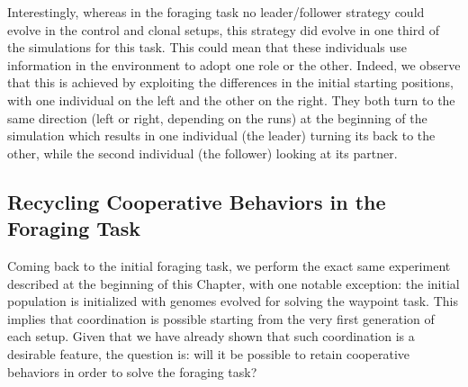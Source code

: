     Interestingly, whereas in the foraging task no leader/follower strategy could evolve in the control and clonal setups, this strategy did evolve in one third of the simulations for this task. This could mean that these individuals use information in the environment to adopt one role or the other. Indeed, we observe that this is achieved by exploiting the differences in the initial starting positions, with one individual on the left and the other on the right. They both turn to the same direction (left or right, depending on the runs) at the beginning of the simulation which results in one individual (the leader) turning its back to the other, while the second individual (the follower) looking at its partner. 


  \subsection{Recycling Cooperative Behaviors in the Foraging Task}

    Coming back to the initial foraging task, we perform the exact same experiment described at the beginning of this Chapter, with one notable exception: the initial population is initialized with genomes evolved for solving the waypoint task. This implies that coordination is possible starting from the very first generation of each setup. Given that we have already shown that such coordination is a desirable feature, the question is: will it be possible to retain cooperative behaviors in order to solve the foraging task?

    \begin{table}[h]
      \caption{\textbf{Evolution of a cooperative strategy.}
      Proportion of the 60 independent simulations where the best individual evolved a cooperative strategy (collecting purple targets) or a solitary strategy (collecting green targets) for each setup in the foraging task when individuals are previously evolved in the waypoints task. In addition, the repartition of the different strategies is indicated when cooperation evolved: \emph{Leader/Follower} (Lead.) or \emph{Turning} (Turn.).}
      \label{tab:RecyclingCoopBehaviors}
    \end{table}

